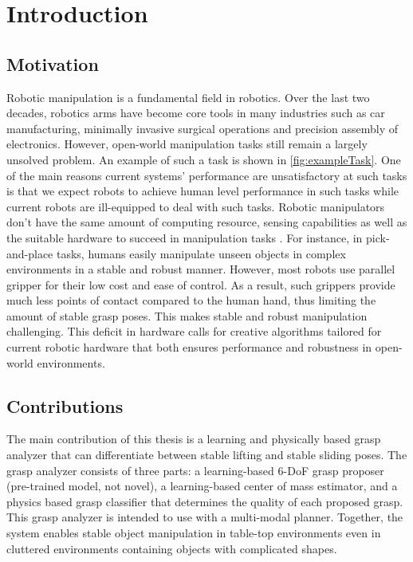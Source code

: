 \documentclass[12pt]{ucsddissertation}
\begin{document}
\chapter{Introduction}
\section{Motivation}
Robotic manipulation is a fundamental field in robotics. Over the last two decades, robotics arms have become core tools in many industries such as car manufacturing, minimally invasive surgical operations and precision assembly of electronics. However, open-world manipulation tasks still remain a largely unsolved problem\cite{Tedrake_2023}.  An example of such a task is shown in \ref{fig:exampleTask}. One of the main reasons current systems' performance are unsatisfactory at such tasks is that we expect robots to achieve human level performance in such tasks while current robots are ill-equipped to deal with such tasks. Robotic manipulators don't have the same amount of computing resource, sensing capabilities as well as the suitable hardware to succeed in manipulation tasks \cite{Wang_Liu_Zhang_Lu_2020} \cite{Xue_Ju_Xiang_Chen_Liu_2017}. For instance, in pick-and-place tasks, humans easily manipulate unseen objects in complex environments in a stable and robust manner. However, most robots use parallel gripper for their low cost and ease of control. As a result, such grippers provide much less points of contact compared to the human hand, thus limiting the amount of stable grasp poses. This makes stable and robust manipulation challenging. This deficit in hardware calls for creative algorithms tailored for current robotic hardware that both ensures performance and robustness in open-world environments.

\section{Contributions}
The main contribution of this thesis is a learning and physically based grasp analyzer that can differentiate between stable lifting and stable sliding poses. The grasp analyzer consists of three parts: a learning-based 6-DoF grasp proposer (pre-trained model, not novel), a learning-based center of mass estimator, and a physics based grasp classifier that determines the quality of each proposed grasp. This grasp analyzer is intended to use with a multi-modal planner. Together, the system enables stable object manipulation in table-top environments even in cluttered environments containing objects with complicated shapes.
\end{document}
